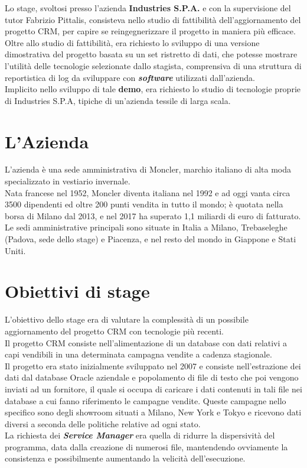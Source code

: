 \pagestyle{fancy}
\fancyhf{}
\fancyhead{}
\thispagestyle{fancy}
\fancyhead[RO, LE] {\thepage}
\fancyfoot{}

Lo stage, svoltosi presso l'azienda \textbf{Industries S.P.A.} e con la supervisione del tutor Fabrizio Pittalis, consisteva nello studio di fattibilità dell'aggiornamento del progetto CRM, per capire se reingegnerizzare il progetto in maniera più efficace.\\
Oltre allo studio di fattibilità, era richiesto lo sviluppo di una versione dimostrativa del progetto basata su un set ristretto di dati, che potesse mostrare l'utilità delle tecnologie selezionate dallo stagista, comprensiva di una struttura di reportistica di log da sviluppare con \textit{\textbf{software}} utilizzati dall'azienda.\\
Implicito nello sviluppo di tale \textbf{demo}, era richiesto lo studio di tecnologie proprie di Industries S.P.A, tipiche di un'azienda tessile di larga scala.

\section{L'Azienda}
L'azienda è una sede amministrativa di Moncler, marchio italiano di alta moda specializzato in vestiario invernale.\\
Nata francese nel 1952, Moncler diventa italiana nel 1992 e ad oggi vanta circa 3500 dipendenti ed oltre 200 punti vendita in tutto il mondo; è quotata nella borsa di Milano dal 2013, e nel 2017 ha superato 1,1 miliardi di euro di fatturato.\\
Le sedi amministrative principali sono situate in Italia a Milano, Trebaseleghe (Padova, sede dello stage) e Piacenza, e nel resto del mondo in Giappone e Stati Uniti.\cite{Mon}

\section{Obiettivi di stage}
L'obiettivo dello stage era di valutare la complessità di un possibile aggiornamento del progetto CRM con tecnologie più recenti.\\
Il progetto CRM consiste nell'alimentazione di un database con dati relativi a capi vendibili in una determinata campagna vendite a cadenza stagionale.\\
Il progetto era stato inizialmente sviluppato nel 2007 e consiste nell'estrazione dei dati dal database Oracle aziendale e popolamento di file di testo che poi vengono inviati ad un fornitore, il quale si occupa di caricare i dati contenuti in tali file nei database a cui fanno riferimento le campagne vendite. Queste campagne nello specifico sono degli showroom situati a Milano, New York e Tokyo e ricevono dati diversi a seconda delle politiche relative ad ogni stato.\\
La richiesta dei \textbf{\textit{Service Manager}} era quella di ridurre la dispersività del programma, data dalla creazione di numerosi file, mantendendo ovviamente la consistenza e possibilmente aumentando la velicità dell'esecuzione.

